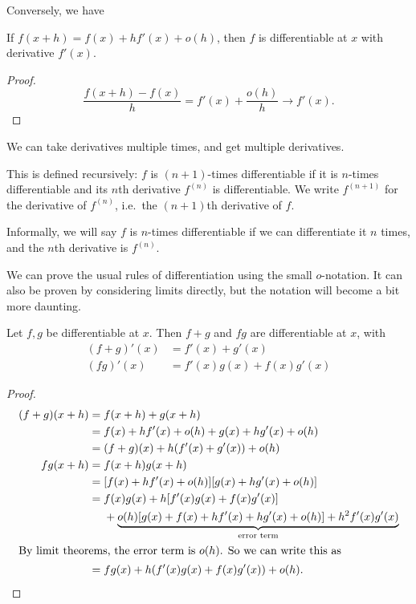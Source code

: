 \documentclass[a4paper]{article}
\begin{document}
Conversely, we have
\begin{prop}
  If $f(x + h) = f(x) + hf'(x) + o(h)$, then $f$ is differentiable at $x$ with derivative $f'(x)$.
\end{prop}
\begin{proof}
  \[
    \frac{f(x + h) - f(x)}{h} = f'(x) + \frac{o(h)}{h} \to f'(x).
  \]
\end{proof}

We can take derivatives multiple times, and get multiple derivatives.
\begin{defi}
  This is defined recursively: $f$ is $(n + 1)$-times differentiable if it is $n$-times differentiable and its $n$th derivative $f^{(n)}$ is differentiable. We write $f^{(n + 1)}$ for the derivative of $f^{(n)}$, i.e.\ the $(n + 1)$th derivative of $f$.

  Informally, we will say $f$ is $n$-times differentiable if we can differentiate it $n$ times, and the $n$th derivative is $f^{(n)}$.
\end{defi}

We can prove the usual rules of differentiation using the small $o$-notation. It can also be proven by considering limits directly, but the notation will become a bit more daunting.
\begin{lemma}
  Let $f, g$ be differentiable at $x$. Then $f + g$ and $fg$ are differentiable at $x$, with
  \begin{align*}
    (f + g)'(x) &= f'(x) + g'(x)\\
    (fg)'(x) &= f'(x)g(x) + f(x)g'(x)
  \end{align*}
\end{lemma}

\begin{proof}
  \begin{align*}
    (f + g)(x + h) ={}& f(x + h) + g(x + h)\\
    ={}& f(x) +hf'(x) + o(h) + g(x) + hg'(x) + o(h)\\
    ={}& (f + g)(x) + h(f'(x) + g'(x)) + o(h)\\
    fg(x + h) ={}& f(x + h)g(x + h)\\
    ={}& [f(x) + hf'(x) + o(h)][g(x) + hg'(x) + o(h)]\\
    ={}& f(x)g(x) + h[f'(x)g(x) + f(x)g'(x)]\\
    &+ \underbrace{o(h)[g(x) + f(x) + hf'(x) + hg'(x) + o(h)] + h^2f'(x)g'(x)}_{\text{error term}}\\
    \intertext{By limit theorems, the error term is $o(h)$. So we can write this as}
    ={}& fg(x) + h(f'(x)g(x) + f(x)g'(x)) + o(h).
  \end{align*}
\end{proof}
\end{document}
